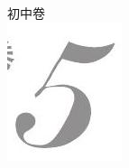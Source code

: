 \documentclass[10pt]{article}
\begin{document}
初中卷\\
\includegraphics[max width=\textwidth, center]{2024_10_30_66b8e5e701da2093c133g-002}\\
\end{document}
